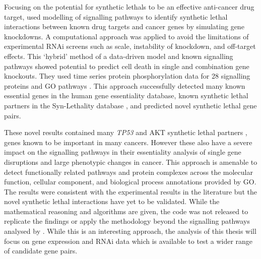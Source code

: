 Focusing on the potential for \glspl{synthetic lethal} to be an effective anti-cancer drug target, \citet{Zhang2015} used modelling of signalling pathways to identify \gls{synthetic lethal} interactions between known drug targets and \glspl{cancer gene} by simulating gene knockdowns. A computational approach was applied to avoid the limitations of experimental \gls{RNAi} screens such as scale, instability of knockdown, and off-target effects. This `hybrid' method of a data-driven model and known signalling pathways showed potential to predict cell death in single and combination gene knockouts. They used time series protein phosphorylation data \citep{Lee2012} for 28 signalling proteins and \gls{GO} \glspl{pathway} \citep{Ashburner2000, Blake2015}. This approach successfully detected many known \gls{essential} genes in the human gene essentiality database, known \gls{synthetic lethal} partners in the Syn-Lethality database \citep{Li2014}, and predicted novel \gls{synthetic lethal} gene pairs. %

These novel results contained many \textit{TP53} and AKT \gls{synthetic lethal} partners \citep{Zhang2015}, genes known to be important in many cancers. However these also have a severe impact on the signalling \glspl{pathway} in their essentiality analysis of single gene disruptions and large phenotypic changes in cancer. This approach is amenable to detect functionally related \glspl{pathway} and protein complexes across the molecular function, cellular component, and biological process annotations provided by \gls{GO}. The results were consistent with the experimental results in the literature but the novel \gls{synthetic lethal} interactions have yet to be validated. While the mathematical reasoning and algorithms are given, the code was not released to replicate the findings or apply the methodology beyond the signalling pathways analysed by \citep{Zhang2015}. While this is an interesting approach, the analysis of this thesis will focus on \gls{gene expression} and \gls{RNAi} data which is available to test a wider range of candidate gene pairs.

